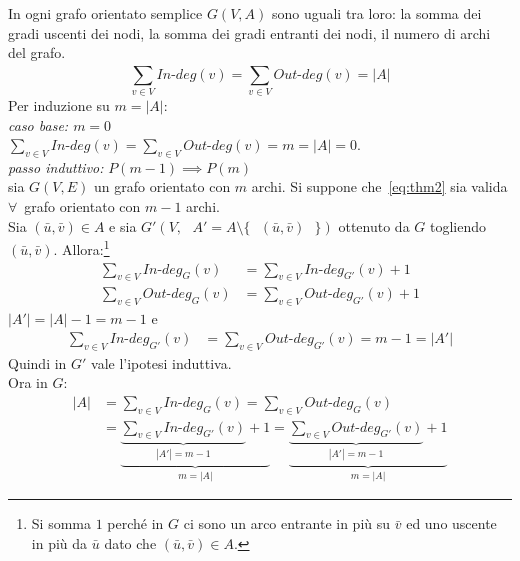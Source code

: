 \begin{thm}
In ogni grafo orientato semplice $G(V,A)$ sono uguali tra loro: la somma dei gradi
uscenti dei nodi, la somma dei gradi entranti dei nodi, il numero di archi del grafo.
\begin{equation}
{\sum_{v \in V}^{} In\text{-}deg(v)} = {\sum_{v \in V}^{} Out\text{-}deg(v)} = |A|
\label{eq:thm2}
\end{equation}
\proof
    Per induzione su $m = |A|$:\\
    \emph{caso base: $m = 0$}\\ 
    \indent $\sum_{v \in V}^{} In\text{-}deg(v) = \sum_{v \in V}^{} Out\text{-}deg(v) =
    m = |A| = 0$.\\
    \emph{passo induttivo:} $P(m-1) \implies P(m)$\\
    \indent sia $G(V,E)$ un grafo orientato con $m$ archi. Si suppone che~\ref{eq:thm2} 
    sia valida $\forall$~grafo orientato con $m-1$ archi.\\
    Sia $(\bar{u}, \bar{v}) \in A$ e sia 
    $G'(V, \text{ } A'=A \setminus \{\text{ } (\bar{u}, \bar{v}) \text{ }\})$ 
    ottenuto da $G$ togliendo $(\bar{u}, \bar{v})$. Allora:\footnote{
        Si somma $1$ perché in $G$ ci sono un arco entrante in più su $\bar{v}$ ed uno
        uscente in più da $\bar{u}$ dato che $(\bar{u},\bar{v}) \in A$.}
    \begin{align*}
        \sum_{v \in V}^{} {In\text{-}deg_{G}(v)} & = \sum_{v \in V}^{} {In\text{-}deg_{G'}(v)} + 1\\
        \sum_{v \in V}^{} Out\text{-}deg_{G}(v) & = \sum_{v \in V}^{} Out\text{-}deg_{G'}(v) + 1
    \end{align*}
    $|A'| = |A| - 1 = m - 1$ e
    \begin{align*}
        \sum_{v \in V}^{} {In\text{-}deg_{G'}(v)} & = \sum_{v \in V}^{} {Out\text{-}deg_{G'}(v)} = 
        m - 1 = |A'|
    \end{align*}
    Quindi in $G'$ vale l'ipotesi induttiva.\\Ora in $G$:
    \begin{equation*}
    \begin{split}
        |A| & = \sum_{v \in V}^{} {In\text{-}deg_{G}(v)} = \sum_{v \in V}^{} {Out\text{-}deg_{G}(v)}\\
    & =\underbrace{\underbrace{\sum_{v \in V}^{} {In\text{-}deg_{G'}(v)}}_{|A'| = m-1}+1}_{m=|A|} =
        \underbrace{\underbrace{\sum_{v \in V}^{} {Out\text{-}deg_{G'}(v)}}_{|A'| = m-1}+1}_{m=|A|}
    \end{split}
    \end{equation*}
\endproof
\end{thm}

